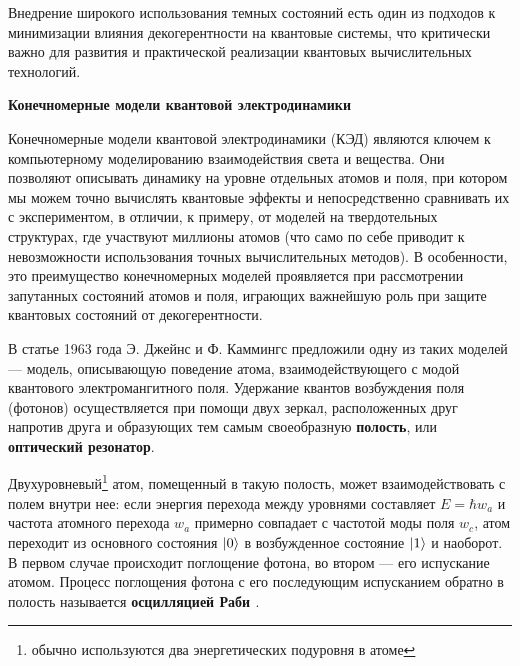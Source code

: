 Внедрение широкого использования темных состояний есть один из под­ходов к минимизации влияния декогерентности на квантовые системы, что критически важно для развития и практической реализации квантовых вычислительных технологий.

\clearpage
\indent\textbf{Конечномерные модели квантовой электродинамики}

Конечномерные модели квантовой электродинамики (КЭД) являются ключем к компьютерному моделированию взаимодействия света и вещества. Они позволяют описывать динамику на уровне отдельных атомов и поля, при котором мы можем точно вычислять квантовые эффекты и непосредственно сравнивать их с экспериментом, в отличии, к примеру, от моделей на твердотельных структурах, где участвуют миллионы атомов (что само по себе приводит к невозможности использования точных вычислительных методов). В особенности, это преимущество конечномерных моделей проявляется при рассмотрении запутанных состояний атомов и поля, играющих важнейшую роль при защите квантовых состояний от декогерентности.

В статье 1963 года \cite{jc_comparison} Э. Джейнс и Ф. Каммингс предложили одну из таких моделей --- модель, описывающую поведение атома, взаимодействующего с модой квантового электромангитного поля. Удержание квантов возбуждения поля (фотонов) осуществляется при помощи двух зеркал, расположенных друг напротив друга и образующих тем самым своеобразную \textbf{полость}, или \textbf{оптический резонатор}.
\begin{figure}[h!]
	\noindent{}
\end{figure}

Двухуровневый\footnote{обычно используются два энергетических подуровня в атоме} атом, помещенный в такую полость, может взаимодействовать с полем внутри нее: если энергия перехода между уровнями составляет $E = \hbar w_{a}$ и частота атомного перехода $w_{a}$ примерно совпадает с частотой моды поля $w_{c}$, атом переходит из основного состояния $|0\rangle$ в возбужденное состояние $|1\rangle$ и наоборот. В первом случае происходит поглощение фотона, во втором --- его испускание атомом. Процесс поглощения фотона с его последующим испусканием обратно в полость называется \textbf{осцилляцией Раби \cite{rabi_1,rabi_2,rabi_3}}. 

